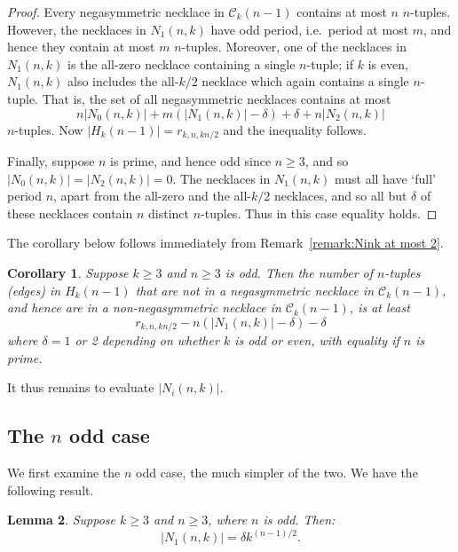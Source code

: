 \documentclass[a4paper,11pt]{article}
\theoremstyle{plain}
\newtheorem{lemma}{Lemma}[section]
\newtheorem{corollary}[lemma]{Corollary}
\theoremstyle{definition}
\theoremstyle{remark}
\begin{document}
\begin{proof}
Every negasymmetric necklace in $\mathcal{C}_k(n-1)$ contains at most $n$ $n$-tuples.  However, the
necklaces in $N_1(n,k)$ have odd period, i.e.\ period at most $m$, and hence they contain at most
$m$ $n$-tuples. Moreover, one of the necklaces in $N_1(n,k)$ is the all-zero necklace containing a
single $n$-tuple; if $k$ is even, $N_1(n,k)$ also includes the all-$k/2$ necklace which again
contains a single $n$-tuple. That is, the set of all negasymmetric necklaces contains at most
\[ n|N_0(n,k)| + m(|N_1(n,k)|-\delta) + \delta + n|N_2(n,k)| \]
$n$-tuples.  Now $|H_k(n-1)|=r_{k,n,kn/2}$ and the inequality follows.

Finally, suppose $n$ is prime, and hence odd since $n\geq3$, and so $|N_0(n,k)|=|N_2(n,k)|=0$. The
necklaces in $N_1(n,k)$ must all have `full' period $n$, apart from the all-zero and the all-$k/2$
necklaces, and so all but $\delta$ of these necklaces contain $n$ distinct $n$-tuples. Thus in this
case equality holds.
\end{proof}

The corollary below follows immediately from Remark~\ref{remark:Nink at most 2}.

\begin{corollary}  \label{corollary:edge_bound_nodd}
Suppose $k\geq3$ and $n\geq3$ is odd.  Then the number of $n$-tuples (edges) in $H_k(n-1)$ that are
not in a negasymmetric necklace in $\mathcal{C}_k(n-1)$, and hence are in a non-negasymmetric
necklace in $\mathcal{C}_k(n-1)$, is at least
\[ r_{k,n,kn/2} - n(|N_1(n,k)|-\delta)-\delta \]
where $\delta=1$ or 2 depending on whether $k$ is odd or even, with equality if $n$ is prime.
\end{corollary}

It thus remains to evaluate $|N_i(n,k)|$.


\subsection{The \texorpdfstring{$n$}{n} odd case}  \label{section:circuit_enumeration_kodd_nodd}  \label{section:circuit_enumeration_nodd}

We first examine the $n$ odd case, the much simpler of the two. We have the following
result.



\begin{lemma} \label{lemma:N1_for_n_odd}
Suppose $k\geq3$ and $n\geq3$, where $n$ is odd. Then:
\[ |N_1(n,k)| = \delta k^{(n-1)/2}.\]
\end{lemma}
\end{document}
